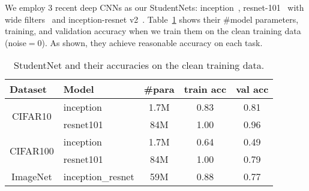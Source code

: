 \documentclass{article}
\begin{document}
We employ 3 recent deep CNNs as our StudentNets: inception~\cite{szegedy2016rethinking}, resnet-101~\cite{he2016deep} with wide filters~\cite{zagoruyko2016wide} and inception-resnet v2~\cite{szegedy2017inception}. Table~\ref{tab:studentnet} shows their \#model parameters, training, and validation accuracy when we train them on the clean training data (noise$=0$). As shown, they achieve reasonable accuracy on each task.


\begin{table}[ht]
\vspace{-5mm}
\centering
\footnotesize
\caption{\label{tab:studentnet}StudentNet and their accuracies on the clean training data.}
\begin{tabular}{cl|ccc}
\hline
\multicolumn{1}{l}{Dataset} & Model             & \#para & {\footnotesize train acc} & {\footnotesize val acc} \\
\hline
\multirow{2}{*}{CIFAR10}    & {\footnotesize inception}     &1.7M         & 0.83         & 0.81        \\
                            & {\footnotesize resnet101}         & 84M       & 1.00         & 0.96        \\
\hline
\multirow{2}{*}{CIFAR100}   & {\footnotesize inception}     &1.7M              &0.64                &0.49               \\
                            & {\footnotesize resnet101}        & 84M   & 1.00         & 0.79        \\
\hline
\multirow{1}{*}{ImageNet}   & {\footnotesize inception\_resnet}  &59M             & 0.88         & 0.77        \\
\hline
\end{tabular}
\vspace{-3mm}
\end{table}
\end{document}
